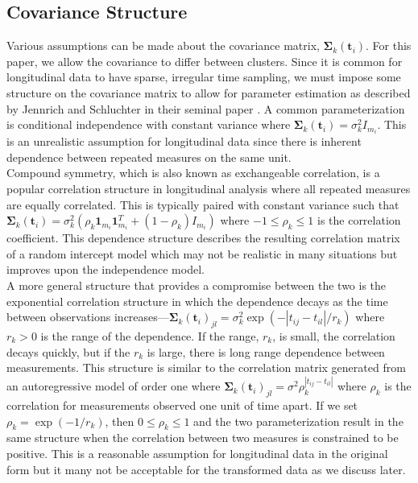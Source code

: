 \documentclass[12pt]{article}
\newcommand{\B}[0]{\mathbf}
\begin{document}
\subsection{Covariance Structure}
Various assumptions can be made about the covariance matrix, $\B \Sigma_{k}(\B t_{i})$. For this paper, we allow the covariance to differ between clusters. Since it is common for longitudinal data to have sparse, irregular time sampling, we must impose some structure on the covariance matrix to allow for parameter estimation as described by Jennrich and Schluchter in their seminal paper \cite{jennrich1986}. A common parameterization is conditional independence with constant variance where $\B \Sigma_{k}(\B t_{i}) = \sigma_{k}^{2}I_{m_{i}}$. This is an unrealistic assumption for longitudinal data since there is inherent dependence between repeated measures on the same unit. \\

Compound symmetry, which is also known as exchangeable correlation, is a popular correlation structure in longitudinal analysis where all repeated measures are equally correlated. This is typically paired with constant variance such that $\B \Sigma_{k}(\B t_{i}) = \sigma_{k}^{2}(\rho_{k}\B1_{m_{i}}\B1_{m_{i}}^{T}+(1-\rho_{k})I_{m_{i}})$ where $-1\leq\rho_{k}\leq 1$ is the correlation coefficient. This dependence structure describes the resulting correlation matrix of a random intercept model which may not be realistic in many situations but improves upon the independence model. \\

A more general structure that provides a compromise between the two is the exponential correlation structure in which the dependence decays as the time between observations increases---$\B \Sigma_{k}(\B t_{i})_{jl} = \sigma_{k}^{2}\exp(-| t_{ij}-t_{il}| / r_{k})$ where $r_{k}> 0$ is the range of the dependence. If the range, $r_{k}$, is small, the correlation decays quickly, but if the $r_{k}$ is large, there is long range dependence between measurements. This structure is similar to the correlation matrix generated from an autoregressive model of order one where $\B\Sigma_{k}(\B t_{i})_{jl} = \sigma^{2}\rho_{k}^{|t_{ij}-t_{il}|}$ where $\rho_{k}$ is the correlation for measurements observed one unit of time apart. If we set $\rho_{k} = \exp(-1/r_{k})$, then $0\leq\rho_{k}\leq1$ and the two parameterization result in the same structure when the correlation between two measures is constrained to be positive. This is a reasonable assumption for longitudinal data in the original form but it many not be acceptable for the transformed data as we discuss later.\\
\end{document}
